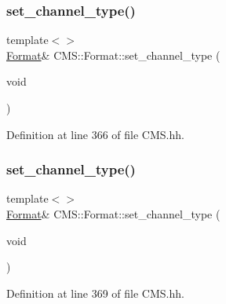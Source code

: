 \subsubsection{\texorpdfstring{set\+\_\+channel\+\_\+type()}{set\_channel\_type()}\hspace{0.1cm}{\footnotesize\ttfamily [6/8]}}
{\footnotesize\ttfamily template$<$$>$ \\
\hyperlink{class_c_m_s_1_1_format}{Format}\& C\+M\+S\+::\+Format\+::set\+\_\+channel\+\_\+type (\begin{DoxyParamCaption}\item[{void}]{ }\end{DoxyParamCaption})\hspace{0.3cm}{\ttfamily [inline]}}



Definition at line 366 of file C\+M\+S.\+hh.

\mbox{\label{class_c_m_s_1_1_format_a04bd5a40c45aca469875c3eb1f72eff8}} 
\subsubsection{\texorpdfstring{set\+\_\+channel\+\_\+type()}{set\_channel\_type()}\hspace{0.1cm}{\footnotesize\ttfamily [7/8]}}
{\footnotesize\ttfamily template$<$$>$ \\
\hyperlink{class_c_m_s_1_1_format}{Format}\& C\+M\+S\+::\+Format\+::set\+\_\+channel\+\_\+type (\begin{DoxyParamCaption}\item[{void}]{ }\end{DoxyParamCaption})\hspace{0.3cm}{\ttfamily [inline]}}



Definition at line 369 of file C\+M\+S.\+hh.

\mbox{\label{class_c_m_s_1_1_format_a04bd5a40c45aca469875c3eb1f72eff8}} 
